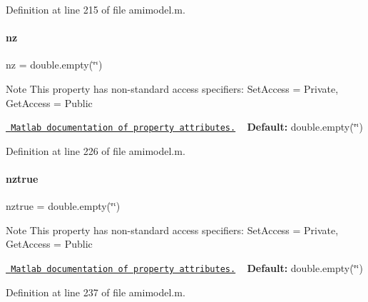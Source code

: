 Definition at line 215 of file amimodel.\+m.

\mbox{\label{classamimodel_a79f11413e5bfe18a0e71e17574399ad5}} 
\paragraph{\texorpdfstring{nz}{nz}}
{\footnotesize\ttfamily nz = double.\+empty(\char`\"{}\char`\"{})}

\begin{DoxyNote}{Note}
This property has non-\/standard access specifiers\+: {\ttfamily Set\+Access = Private, Get\+Access = Public} 

\href{http://www.mathworks.com/help/matlab/matlab_oop/property-attributes.html}{\texttt{ Matlab documentation of property attributes.}} ~\newline
{\bfseries{Default\+:}} double.\+empty(\char`\"{}\char`\"{}) 
\end{DoxyNote}


Definition at line 226 of file amimodel.\+m.

\mbox{\label{classamimodel_a364ecd990baeeefd1de3e6795cd50a58}} 
\paragraph{\texorpdfstring{nztrue}{nztrue}}
{\footnotesize\ttfamily nztrue = double.\+empty(\char`\"{}\char`\"{})}

\begin{DoxyNote}{Note}
This property has non-\/standard access specifiers\+: {\ttfamily Set\+Access = Private, Get\+Access = Public} 

\href{http://www.mathworks.com/help/matlab/matlab_oop/property-attributes.html}{\texttt{ Matlab documentation of property attributes.}} ~\newline
{\bfseries{Default\+:}} double.\+empty(\char`\"{}\char`\"{}) 
\end{DoxyNote}


Definition at line 237 of file amimodel.\+m.

\mbox{\label{classamimodel_acf2488b95c97e0378c9bf49de3b50f28}} 
